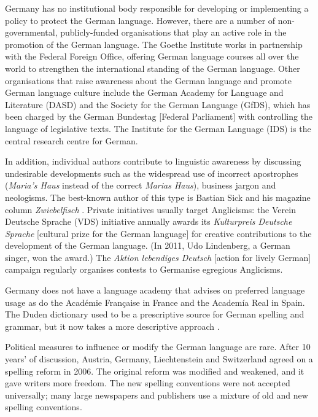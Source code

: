 \begin{multicols}{2}
Germany has no institutional body responsible for developing or implementing a policy to protect the German language. However, there are a number of non-governmental, publicly-funded organisations that play an active role in the promotion of the German language. The Goethe Institute works in partnership with the Federal Foreign Office, offering German language courses all over the world to strengthen the international standing of the German language. Other organisations that raise awareness about the German language and promote German language culture include the German Academy for Language and Literature (DASD) and the Society for the German Language (GfDS), which has been charged by the German Bundestag [Federal Parliament] with controlling the language of legislative texts. The Institute for the German Language (IDS) is the central research centre for German. 

In addition, individual authors contribute to linguistic awareness by discussing undesirable developments such as the widespread use of incorrect apostrophes (\textit{Maria’s Haus} instead of the correct \textit{Marias Haus}), business jargon and neologisms. The best-known author of this type is Bastian Sick  \cite{Sick1} and his magazine column \textit{Zwiebelfisch} \cite{Sick2}. Private initiatives usually target Anglicisms: the Verein Deutsche Sprache (VDS) initiative annually awards its \textit{Kulturpreis Deutsche Sprache} [cultural prize for the German language] for creative contributions to the development of the German language. (In 2011, Udo Lindenberg, a German singer, won the award.) The \textit{Aktion lebendiges Deutsch} [action for lively German] campaign regularly organises contests to Germanise egregious Anglicisms.

Germany does not have a language academy that advises on preferred language usage as do the Académie Française in France and the Academía Real in Spain. The Duden dictionary used to be a prescriptive source for German spelling and grammar, but it now takes a more descriptive approach \cite{Schn1}. 


Political measures to influence or modify the German language are rare. After 10 years’ of discussion, Austria, Germany, Liechtenstein and Switzerland agreed on a spelling reform in 2006. The original reform was modified and weakened, and it gave writers more freedom. The new spelling conventions were not accepted universally; many large newspapers and publishers use a mixture of old and new spelling conventions.


\end{multicols}

